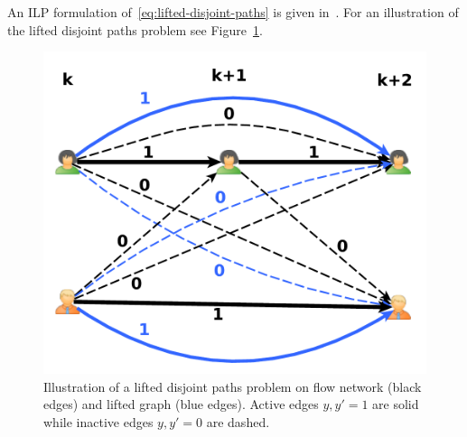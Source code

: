 An ILP formulation of~\eqref{eq:lifted-disjoint-paths} is given in~\cite{hornakova2020lifted}.
For an illustration of the lifted disjoint paths problem see Figure~\ref{fig:LDP}.

%

\begin{figure}
	\centering
	\includegraphics[width=0.9\columnwidth]{images/illustrationLDP}
	\caption{Illustration of a lifted disjoint paths problem on flow network (black edges) and lifted graph (blue edges).
		Active edges $y,y' = 1$ are solid while inactive edges $y,y' = 0$ are dashed.}
	\label{fig:LDP}	
\end{figure}


